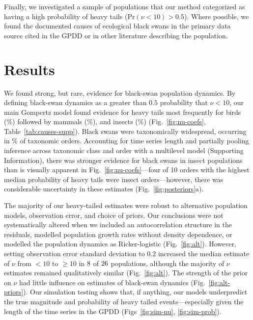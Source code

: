 Finally, we investigated a sample of populations that our method categorized as
having a high probability of heavy tails (Pr$(\nu < 10) > 0.5$). Where
possible, we found the documented causes of ecological black swans in the
primary data source cited in the GPDD or in other literature describing the
population.

\section{Results}

We found strong, but rare, evidence for black-swan population dynamics. By
defining black-swan dynamics as a greater than $0.5$ probability that $\nu <
10$, our main Gompertz model found evidence for heavy tails most frequently
for birds (\birdPH\%) followed by mammals (\mammalsPH\%), and insects
(\insectsPH\%) (Fig.~\ref{fig:nu-coefs}, Table~\ref{tab:causes-supp}). Black
swans were taxonomically widespread, occurring in \POrdersHeavy\% of taxonomic
orders. Accounting for time series length and partially pooling inference
across taxonomic class and order with a multilevel model (Supporting
Information), there was stronger evidence for black swans in insect
populations than is visually apparent in Fig.~\ref{fig:nu-coefs}---four of 10
orders with the highest median probability of heavy tails were insect
orders---however, there was considerable uncertainty in these estimates
(Fig.~\ref{fig:posteriors}a).

The majority of our heavy-tailed estimates were robust to alternative
population models, observation error, and choice of priors. Our conclusions
were not systematically altered when we included an autocorrelation structure
in the residuals, modelled population growth rates without density dependence,
or modelled the population dynamics as Ricker-logistic (Fig.~\ref{fig:alt}).
However, setting observation error standard deviation to $0.2$ increased the
median estimate of $\nu$ from $<10$ to $\ge 10$ in $8$ of
$26$ populations, although the majority of $\nu$ estimates remained
qualitatively similar (Fig.~\ref{fig:alt}). The strength of the prior on $\nu$
had little influence on estimates of black-swan dynamics
(Fig.~\ref{fig:alt-priors}). Our simulation testing shows that, if anything,
our models underpredict the true magnitude and probability of heavy tailed
events---especially given the length of the time series in the GPDD
(Figs~\ref{fig:sim-nu}, \ref{fig:sim-prob}).

